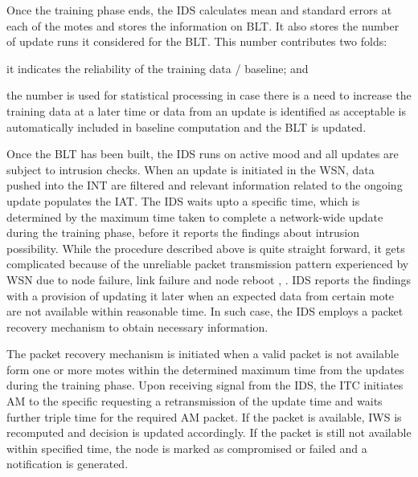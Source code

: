 \documentclass[conference,final]{IEEEtran}
\begin{document}
Once the training phase ends, the IDS calculates mean and standard errors at each of the motes and stores the  information on BLT.
It also stores the number of update runs it considered for the BLT.
This number contributes two folds:
\begin{inparaenum}
\item it indicates the reliability of the training data / baseline; and
\item the number is used for statistical processing in case there is a need to increase the training data at a later time or data from an update is identified as acceptable is automatically included in baseline computation and the BLT is updated.
\end{inparaenum}
Once the BLT has been built, the IDS runs on active mood and all updates are subject to intrusion checks.
When an update is initiated in the WSN, data pushed into the INT are filtered and relevant information related to the ongoing update populates the  IAT.
The IDS waits upto a specific time, which is determined by the maximum time taken to complete a network-wide  update during the training phase, before it reports the findings about intrusion possibility.
While the procedure described above is quite straight forward, it gets complicated because of the unreliable packet transmission pattern experienced by WSN due to node failure, link failure and node reboot \cite{aro04}, \cite{bec04}.
IDS reports the findings with a provision of updating it later when an expected data from certain mote are not available within reasonable time.
In such case, the IDS employs a packet recovery mechanism to obtain necessary information.

The packet recovery mechanism is initiated when a valid packet is not available form one or more motes within  the  determined maximum time from the updates  during the training phase.
Upon receiving signal from the IDS, the ITC initiates AM to the specific requesting a retransmission of the update time and waits further  triple time for the required AM packet. If the packet is available,  IWS is recomputed and decision is updated accordingly.
If the packet is still not available within specified time, the node is marked as compromised or failed and a notification is generated.





\end{document}
